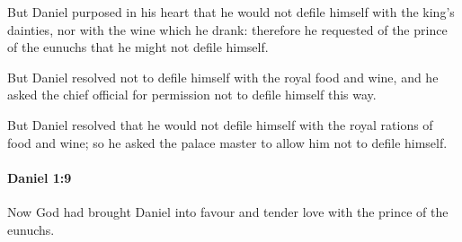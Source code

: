 			\begin{versebox}
					\item[BHS] 
					\item[LXX] 
					\item[ASV] But Daniel purposed in his heart that he would not defile himself with the king's dainties, nor with the wine which he drank: therefore he requested of the prince of the eunuchs that he might not defile himself.
					\item[NIV] But Daniel resolved not to defile himself with the royal food and wine, and he asked the chief official for permission not to defile himself this way.
					\item[NRSV] But Daniel resolved that he would not defile himself with the royal rations of food and wine; so he asked the palace master to allow him not to defile himself.
			\end{versebox}

		\paragraph{Daniel 1:9} %
			\label{DANIEL-1-9}

			Now God had brought Daniel into favour and tender love with the prince of the eunuchs.

